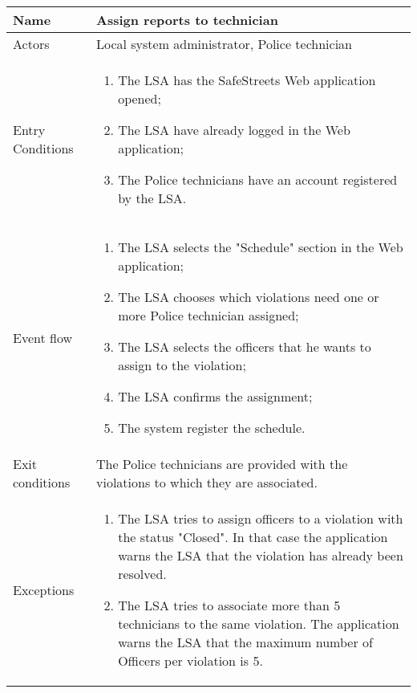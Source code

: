 \begin{table}[H]
  \centering
  \begin{tabularx}{\textwidth}{ |l|X| }
    \hline
    Name & Assign reports to technician \\
    \hline
    Actors & Local system administrator, Police technician\\
    \hline
    Entry Conditions & \begin{enumerate}[noitemsep]
                        \item The LSA has the SafeStreets Web application opened;
                        \item The LSA have already logged in the Web application;
                        \item The Police technicians have an account registered by the LSA.
                      \end{enumerate}\\
    \hline
    Event flow & \begin{enumerate}[noitemsep]
                    \item The LSA selects the "Schedule" section in the Web application;
                    \item The LSA chooses which violations need one or more Police technician assigned;
                    \item The LSA selects the officers that he wants to assign to the violation;
                    \item The LSA confirms the assignment;
                    \item The system register the schedule.           
                \end{enumerate}\\
    \hline
    Exit conditions & The Police technicians are provided with the violations to which they are associated.\\ 
    \hline
    Exceptions &  \begin{enumerate}[noitemsep]
                    \item The LSA tries to assign officers to a violation with the status "Closed". In that case the application warns the LSA that the violation has already been resolved.
                    \item The LSA tries to associate more than 5 technicians to the same violation. The application warns the LSA that the maximum number of Officers per violation is 5. 
                  \end{enumerate}\\
    \hline
  \end{tabularx}
\end{table}
